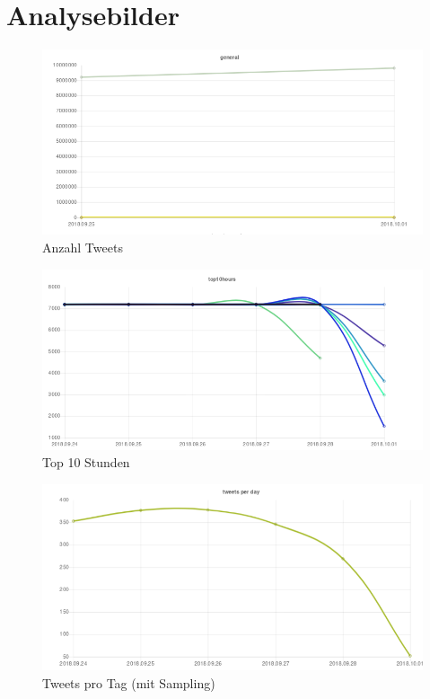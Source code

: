 \section{Analysebilder}
\begin{figure}
\centering
\includegraphics[width=\textwidth]{bilder/BilderAnalyse-img1.png}
\caption{Anzahl Tweets}
\end{figure}
\begin{figure}
\centering
\includegraphics[width=\textwidth]{bilder/BilderAnalyse-img2.png}
\caption{Top 10 Stunden}
\end{figure}
\begin{figure}
\centering
\includegraphics[width=\textwidth]{bilder/BilderAnalyse-img3.png}
\caption{Tweets pro Tag (mit Sampling)}
\end{figure}

